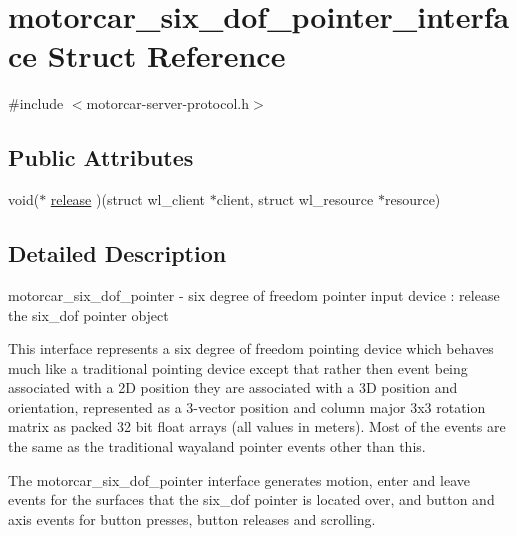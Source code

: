 \hypertarget{structmotorcar__six__dof__pointer__interface}{\section{motorcar\-\_\-six\-\_\-dof\-\_\-pointer\-\_\-interface Struct Reference}
\label{structmotorcar__six__dof__pointer__interface}
}


{\ttfamily \#include $<$motorcar-\/server-\/protocol.\-h$>$}

\subsection*{Public Attributes}
\begin{DoxyCompactItemize}
\item 
void($\ast$ \hyperlink{structmotorcar__six__dof__pointer__interface_af0a50e3dcf962950e332433fc3242d83}{release} )(struct wl\-\_\-client $\ast$client, struct wl\-\_\-resource $\ast$resource)
\end{DoxyCompactItemize}


\subsection{Detailed Description}
motorcar\-\_\-six\-\_\-dof\-\_\-pointer -\/ six degree of freedom pointer input device \-: release the six\-\_\-dof pointer object

This interface represents a six degree of freedom pointing device which behaves much like a traditional pointing device except that rather then event being associated with a 2\-D position they are associated with a 3\-D position and orientation, represented as a 3-\/vector position and column major 3x3 rotation matrix as packed 32 bit float arrays (all values in meters). Most of the events are the same as the traditional wayaland pointer events other than this.

The motorcar\-\_\-six\-\_\-dof\-\_\-pointer interface generates motion, enter and leave events for the surfaces that the six\-\_\-dof pointer is located over, and button and axis events for button presses, button releases and scrolling. 

